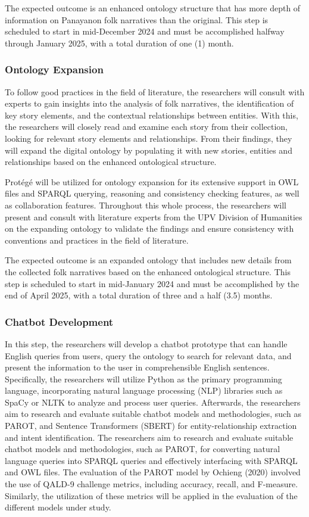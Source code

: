    The expected outcome is an enhanced ontology structure that has more depth of information on Panayanon folk narratives than the original. This step is scheduled to start in mid-December 2024 and must be accomplished halfway through January 2025, with a total duration of one (1) month.

\subsubsection{Ontology Expansion}

    To follow good practices in the field of literature, the researchers will consult with experts to gain insights into the analysis of folk narratives, the identification of key story elements, and the contextual relationships between entities. With this, the researchers will closely read and examine each story from their collection, looking for relevant story elements and relationships. From their findings, they will expand the digital ontology by populating it with new stories, entities and relationships based on the enhanced ontological structure. 
    
    Protégé will be utilized for ontology expansion for its extensive support in OWL files and SPARQL querying, reasoning and consistency checking features, as well as collaboration features. Throughout this whole process, the researchers will present and consult with literature experts from the UPV Division of Humanities on the expanding ontology to validate the findings and ensure consistency with conventions and practices in the field of literature.
    
    The expected outcome is an expanded ontology that includes new details from the collected folk narratives based on the enhanced ontological structure. This step is scheduled to start in mid-January 2024 and must be accomplished by the end of April 2025, with a total duration of three and a half (3.5) months.

\subsubsection{Chatbot Development}
    In this step, the researchers will develop a chatbot prototype that can handle English queries from users, query the ontology to search for relevant data, and present the information to the user in comprehensible English sentences. Specifically, the researchers will utilize Python as the primary programming language, incorporating natural language processing (NLP) libraries such as SpaCy or NLTK to analyze and process user queries. Afterwards, the researchers aim to research and evaluate suitable chatbot models and methodologies, such as PAROT, and Sentence Transformers (SBERT) for entity-relationship extraction and intent identification. The researchers aim to research and evaluate suitable chatbot models and methodologies, such as PAROT,  for converting natural language queries into SPARQL queries and effectively interfacing with SPARQL and OWL files. The evaluation of the PAROT model by Ochieng (2020) involved the use of QALD-9 challenge metrics, including accuracy, recall, and F-measure. Similarly, the utilization of these metrics will be applied in the evaluation of the different models under study.

